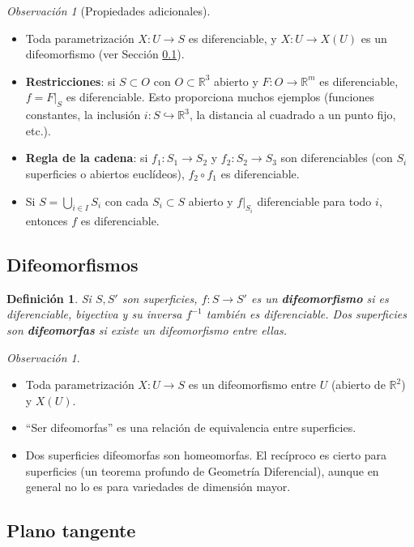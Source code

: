 \documentclass[11pt]{article}
\theoremstyle{plain}
\newtheorem{definicion}[teorema]{Definición}
\theoremstyle{definition}
\theoremstyle{remark}
\newtheorem{observacion}[teorema]{Observación}
\begin{document}
\begin{observacion}[Propiedades adicionales]\
\begin{itemize}
\item Toda parametrización $X:U\to S$ es diferenciable, y $X:U\to X(U)$ es un difeomorfismo (ver Sección \ref{sec:difeo}).
\item \textbf{Restricciones}: si $S\subset O$ con $O\subset\mathbb{R}^3$ abierto y $F:O\to\mathbb{R}^m$ es diferenciable, $f=F|_S$ es diferenciable. Esto proporciona muchos ejemplos (funciones constantes, la inclusión $i:S\hookrightarrow\mathbb{R}^3$, la distancia al cuadrado a un punto fijo, etc.).
\item \textbf{Regla de la cadena}: si $f_1:S_1\to S_2$ y $f_2:S_2\to S_3$ son diferenciables (con $S_i$ superficies o abiertos euclídeos), $f_2\circ f_1$ es diferenciable.
\item Si $S=\bigcup_{i\in I}S_i$ con cada $S_i\subset S$ abierto y $f|_{S_i}$ diferenciable para todo $i$, entonces $f$ es diferenciable.
\end{itemize}
\end{observacion}

\subsection{Difeomorfismos}\label{sec:difeo}

\begin{definicion}
Si $S,S'$ son superficies, $f:S\to S'$ es un \textbf{difeomorfismo} si es diferenciable, biyectiva y su inversa $f^{-1}$ también es diferenciable. Dos superficies son \textbf{difeomorfas} si existe un difeomorfismo entre ellas.
\end{definicion}

\begin{observacion}\
\begin{itemize}
\item Toda parametrización $X:U\to S$ es un difeomorfismo entre $U$ (abierto de $\mathbb{R}^2$) y $X(U)$.
\item ``Ser difeomorfas'' es una relación de equivalencia entre superficies.
\item Dos superficies difeomorfas son homeomorfas. El recíproco es cierto para superficies (un teorema profundo de Geometría Diferencial), aunque en general no lo es para variedades de dimensión mayor.
\end{itemize}
\end{observacion}

\subsection{Plano tangente}
\end{document}
